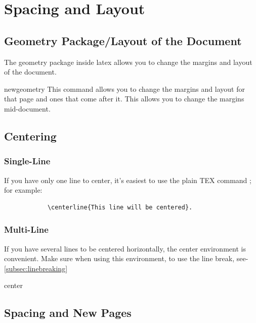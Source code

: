 \documentclass[12pt,hidelinks]{article}
\begin{document}
\section{Spacing and Layout}
\vspace{10.5cm}
	\subsection{Geometry Package/Layout of the Document}
		The geometry package inside latex allows you to change the margins and layout of the document.
			\begin{docCommand}{newgeometry}{} 
				This command allows you to change the margins and layout for that page and ones that come after it. This allows you to change the margins mid-document.
			\end{docCommand}
	\subsection{Centering}
		\subsubsection{Single-Line}
			If you have only one line to center, it’s easiest to use the plain TEX command ; for example:
    		\begin{verbatim}
    	    \centerline{This line will be centered}.
    		\end{verbatim}
		\subsubsection{Multi-Line}
			If you have several lines to be centered horizontally, the center environment is convenient. Make sure when using this environment, to use the line break, see-    \ref{subsec:linebreaking}
			\begin{docEnvironment}{center}{}
			\end{docEnvironment}
	\subsection{Spacing and New Pages}
\end{document}
